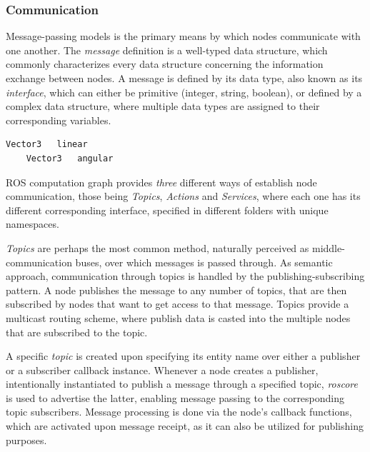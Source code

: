 \subsubsection{Communication}

Message-passing models is the primary means by which nodes communicate with one another. The \textit{message} definition is a well-typed data structure, which commonly characterizes every data structure concerning the information exchange between nodes. A message is defined by its data type, also known as its \textit{interface}, which can either be primitive (integer, string, boolean), or defined by a complex data structure, where multiple data types are assigned to their corresponding variables. 

\begin{lstlisting}[title={\texttt{Twist.msg} interface file that is used to trigger the turtle movement.}]
    Vector3   linear
    Vector3   angular
\end{lstlisting}

ROS computation graph provides \textit{three} different ways of establish node communication, those being \textit{Topics}, \textit{Actions} and \textit{Services}, where each one has its different corresponding interface, specified in different folders with unique namespaces. 



\textit{Topics} are perhaps the most common method, naturally perceived as middle-communication buses, over which messages is passed through. As semantic approach, communication through topics is handled by the publishing-subscribing pattern. A node publishes the message to any number of topics, that are then subscribed by nodes that want to get access to that message. Topics provide a multicast routing scheme, where publish data is casted into the multiple nodes that are subscribed to the topic. 

A specific \textit{topic} is created upon specifying its entity name over either a publisher or a subscriber callback instance. Whenever a node creates a publisher, intentionally instantiated to publish a message through a specified topic, \textit{roscore} is used to advertise the latter, enabling message passing to the corresponding topic subscribers. Message processing is done via the node's callback functions, which are activated upon message receipt, as it can also be utilized for publishing purposes. \cite{casini2019response} %

